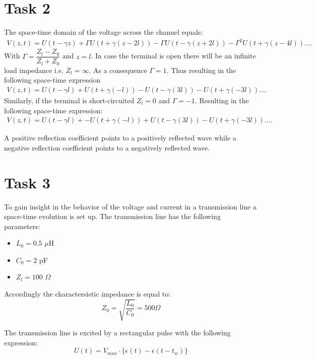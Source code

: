 \documentclass[final]{scrreprt} %
\begin{document}
\label{ch:sk5-ass1-task2}
\section{Task 2}
The space-time domain of the voltage across the channel equals:
\begin{align}
\label{eq:space-time}
V(z,t) = U(t-\gamma z) + \Gamma U(t + \gamma(z-2l)) - \Gamma U(t-\gamma(z+2l)) - \Gamma^2U(t+\gamma(z-4l))....
\end{align}
With $\Gamma = \dfrac{Z_l - Z_0}{Z_l + Z_0}$ and $z = l$. 
In case the terminal is open there will be an infinite load impedance i.e. $Z_l = \infty$. 
As a consequence $\Gamma = 1$. 
Thus resulting in the following space-time expression 
\begin{align*}
V(z,t) = U(t-\gamma l) + U(t + \gamma(-l)) - U(t-\gamma(3l)) - U(t+\gamma(-3l))....
\end{align*}
Similarly, if the terminal is short-circuited $Z_l = 0$ and $\Gamma = -1$. 
Resulting in the following space-time expression:
\begin{align*}
V(z,t) = U(t-\gamma l) + -U(t + \gamma(-l)) + U(t-\gamma(3l)) - U(t+\gamma(-3l))....
\end{align*}

A positive reflection coefficient points to a positively reflected wave while a negative reflection coefficient points to a negatively reflected wave.

\label{ch:sk5-ass1-task3}
\section{Task 3}
To gain insight in the behavior of the voltage and current in a transmission line a space-time evolution is set up.
The transmission line has the following parameters: 
\begin{itemize}
\item $L_0 = 0.5$ $\mu$H
\item $C_0 = 2$ pF
\item $Z_l = 100$ $\Omega$
\end{itemize}

Accordingly the charactersistic impedance is equal to:
\begin{equation}
Z_0 = \sqrt{\dfrac{L_0}{C_0}} = 500 \Omega
\end{equation}

The transmission line is excited by a rectangular pulse with the following expression:
\begin{equation}
\label{eq:rectangularpulse}
U(t) = V_{max} \cdot \{\epsilon(t) - \epsilon(t-t_w)\}
\end{equation}
\end{document}
